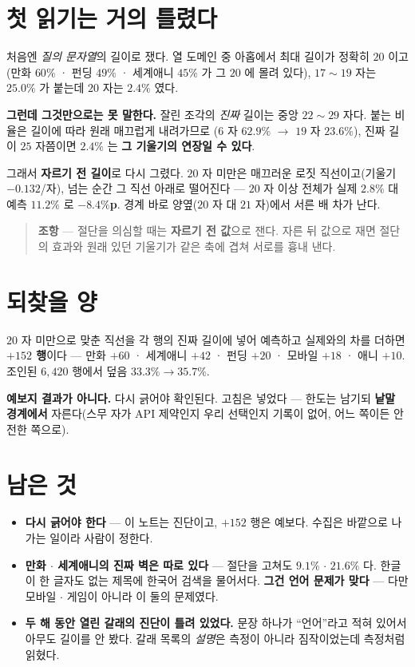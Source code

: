 \documentclass[11pt]{article}
\begin{document}
\section{첫 읽기는 거의 틀렸다}

처음엔 \emph{질의 문자열}의 길이로 쟀다. 열 도메인 중 아홉에서 최대
길이가 정확히 $20$ 이고(만화 $60\%$ · 펀딩 $49\%$ · 세계애니 $45\%$ 가 그
$20$ 에 몰려 있다), $17 \sim 19$ 자는 $25.0\%$ 가 붙는데 $20$ 자는
$2.4\%$ 였다.

\textbf{그런데 그것만으로는 못 말한다.} 잘린 조각의 \emph{진짜} 길이는
중앙 $22 \sim 29$ 자다. 붙는 비율은 길이에 따라 원래 매끄럽게 내려가므로
($6$ 자 $62.9\%$ $\to$ $19$ 자 $23.6\%$), 진짜 길이 $25$ 자쯤이면
$2.4\%$ 는 \textbf{그 기울기의 연장일 수 있다}.

그래서 \textbf{자르기 전 길이}로 다시 그렸다. $20$ 자 미만은 매끄러운
로짓 직선이고(기울기 $-0.132$/자), 넘는 순간 그 직선 아래로 떨어진다 ---
$20$ 자 이상 전체가 실제 $2.8\%$ 대 예측 $11.2\%$ 로 \textbf{$-8.4\%$p}.
경계 바로 양옆($20$ 자 대 $21$ 자)에서 서른 배 차가 난다.

\begin{quote}
\textbf{조항} --- 절단을 의심할 때는 \textbf{자르기 전 값}으로 잰다.
자른 뒤 값으로 재면 절단의 효과와 원래 있던 기울기가 같은 축에 겹쳐
서로를 흉내 낸다.
\end{quote}

\section{되찾을 양}

$20$ 자 미만으로 맞춘 직선을 각 행의 진짜 길이에 넣어 예측하고 실제와의
차를 더하면 \textbf{$+152$ 행}이다 --- 만화 $+60$ · 세계애니 $+42$ ·
펀딩 $+20$ · 모바일 $+18$ · 애니 $+10$. 조인된 $6{,}420$ 행에서 덮음
$33.3\% \to 35.7\%$.

\textbf{예보지 결과가 아니다.} 다시 긁어야 확인된다. 고침은 넣었다 ---
한도는 남기되 \textbf{낱말 경계에서} 자른다(스무 자가 API 제약인지 우리
선택인지 기록이 없어, 어느 쪽이든 안전한 쪽으로).

\section*{남은 것}

\begin{itemize}
\item \textbf{다시 긁어야 한다} --- 이 노트는 진단이고, $+152$ 행은
예보다. 수집은 바깥으로 나가는 일이라 사람이 정한다.
\item \textbf{만화 $\cdot$ 세계애니의 진짜 벽은 따로 있다} --- 절단을
고쳐도 $9.1\%$ $\cdot$ $21.6\%$ 다. 한글이 한 글자도 없는 제목에
한국어 검색을 물어서다. \textbf{그건 언어 문제가 맞다} --- 다만
모바일 $\cdot$ 게임이 아니라 이 둘의 문제였다.
\item \textbf{두 해 동안 열린 갈래의 진단이 틀려 있었다.} 문장 하나가
``언어''라고 적혀 있어서 아무도 길이를 안 봤다. 갈래 목록의 \emph{설명}은
측정이 아니라 짐작이었는데 측정처럼 읽혔다.
\end{itemize}
\end{document}
